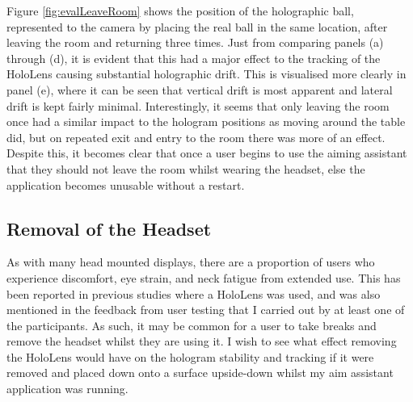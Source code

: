 \documentclass[ %
                author={Finn Alexander Wilkinson},
                supervisor={Dr. Andrew Calway},
                degree={MEng},
                title={\centering A Mixed Reality Aim Assistant for Pool and Snooker},
                subtitle={},
                type={Enterprise},
                year={2021} ]{dissertation}
\begin{document}
Figure \ref{fig:evalLeaveRoom} shows the position of the holographic ball, represented to the camera by placing the real ball in the same location, after leaving the room and returning three times. Just from comparing panels (a) through (d), it is evident that this had a major effect to the tracking of the HoloLens causing substantial holographic drift. This is visualised more clearly in panel (e), where it can be seen that vertical drift is most apparent and lateral drift is kept fairly minimal. Interestingly, it seems that only leaving the room once had a similar impact to the hologram positions as moving around the table did, but on repeated exit and entry to the room there was more of an effect. Despite this, it becomes clear that once a user begins to use the aiming assistant that they should not leave the room whilst wearing the headset, else the application becomes unusable without a restart. 

\subsection{Removal of the Headset}
As with many head mounted displays, there are a proportion of users who experience discomfort, eye strain, and neck fatigue from extended use. This has been reported in previous studies where a HoloLens was used\cite{holoLesnComfortPaperExample}, and was also mentioned in the feedback from user testing that I carried out by at least one of the participants. As such, it may be common for a user to take breaks and remove the headset whilst they are using it. I wish to see what effect removing the HoloLens would have on the hologram stability and tracking if it were removed and placed down onto a surface upside-down whilst my aim assistant application was running. 
\end{document}
